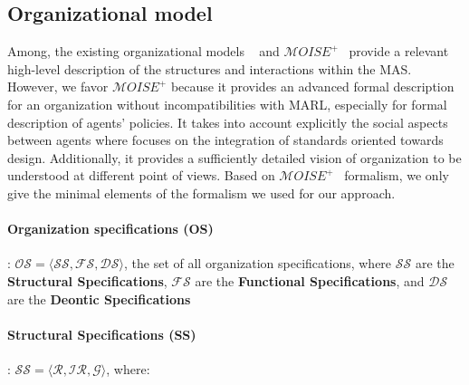 \documentclass{ecai}
\begin{document}
\subsection{Organizational model}

Among, the existing organizational models ~\citep{Ferber2004} and $\mathcal{M}OISE^+$~\citep{Hubner2002} provide a relevant high-level description of the structures and interactions within the MAS. However, we favor $\mathcal{M}OISE^+$ because it provides an advanced formal description for an organization without incompatibilities with MARL, especially for formal description of agents' policies. It takes into account explicitly the social aspects between agents where  focuses on the integration of standards oriented towards design. Additionally, it provides a sufficiently detailed vision of organization to be understood at different point of views.
Based on $\mathcal{M}OISE^+$~\citep{Hubner2007} formalism, we only give the minimal elements of the formalism we used for our approach.

\paragraph{\textbf{Organization specifications (OS)}}: $\mathcal{OS} = \langle \mathcal{SS}, \mathcal{FS}, \mathcal{DS} \rangle$, the set of all organization specifications, where $\mathcal{SS}$ are the \textbf{Structural Specifications}, $\mathcal{FS}$ are the \textbf{Functional Specifications}, and $\mathcal{DS}$ are the \textbf{Deontic Specifications}

\paragraph{\textbf{Structural Specifications (SS)}}: $\mathcal{SS} = \langle \mathcal{R}, \mathcal{IR}, \mathcal{G} \rangle$, where:
\end{document}
